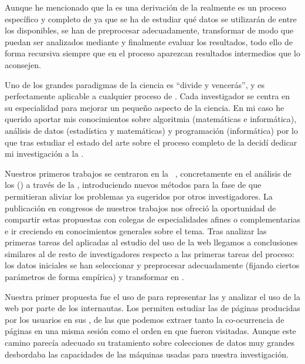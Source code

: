 Aunque he mencionado que la \WUM es una derivación de la \DM realmente es un proceso específico y completo de \KDD ya que se ha de estudiar qué datos se utilizarán de entre los disponibles, se han de preprocesar adecuadamente, transformar de modo que puedan ser analizados mediante \DM y finalmente evaluar los resultados, todo ello de forma recursiva siempre que en el proceso aparezcan resultados intermedios que lo aconsejen.

Uno de los grandes paradigmas de la ciencia es "`divide y vencerás"', y es perfectamente aplicable a cualquier proceso de \KDD. Cada investigador se centra en su especialidad para mejorar un pequeño aspecto de la ciencia. En mi caso he querido aportar mis conocimientos sobre algoritmia (matemáticas e informática), análisis de datos (estadística y matemáticas) y programación (informática) por lo que tras estudiar el estado del arte sobre el proceso completo de la \wum decidí dedicar mi investigación a la \dm.

Nuestros primeros trabajos se centraron en la ~\citep{Anderson-AMachineLearningApproachToWebPersonalization-2002}, concretamente en el análisis de los \srws (\SRW) a través de la \wum, introduciendo nuevos métodos para la fase de \dm que permitieran aliviar los problemas ya sugeridos por otros investigadores. La publicación en congresos de nuestros trabajos nos ofreció la oportunidad de compartir estas propuestas con colegas de especialidades afines o complementarias e ir creciendo en conocimientos generales sobre el tema. Tras analizar las primeras tareas del \KDD aplicadas al estudio del uso de la web llegamos a conclusiones similares al de resto de investigadores respecto a las primeras tareas del proceso: los datos iniciales se han seleccionar y preprocesar adecuadamente (fijando ciertos parámetros de forma empírica) y transformar en \sns.

Nuestra primer propuesta fue el uso de \grafos para representar las \sns y analizar el uso de la web por parte de los internautas. Los \grafos permiten estudiar las \secuencias de páginas producidas por los usuarios en sus \sns, de las que podemos extraer tanto la co-ocurrencia de páginas en una misma sesión como el orden en que fueron visitadas. Aunque este camino parecía adecuado su tratamiento sobre colecciones de datos muy grandes desbordaba las capacidades de las máquinas usadas para nuestra investigación.

